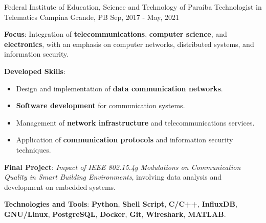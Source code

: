 
\begin{cventries}
  \cventry
  {Federal Institute of Education, Science and Technology of Paraíba} %
  {Technologist in Telematics} %
  {Campina Grande, PB} %
  {Sep, 2017 - May, 2021} %
  {
    \begin{cvitems}
      \item {\textbf{Focus}: Integration of \textbf{telecommunications}, \textbf{computer science}, and \textbf{electronics}, with an emphasis on computer networks, distributed systems, and information security.}
      \item {\textbf{Developed Skills}:}
      \begin{itemize}
        \item {Design and implementation of \textbf{data communication networks}.}
        \item {\textbf{Software development} for communication systems.}
        \item {Management of \textbf{network infrastructure} and telecommunications services.}
        \item {Application of \textbf{communication protocols} and information security techniques.}
      \end{itemize}
      \item {\textbf{Final Project}: \emph{Impact of IEEE 802.15.4g Modulations on Communication Quality in Smart Building Environments}, involving data analysis and development on embedded systems.}
      \item {\textbf{Technologies and Tools}: \textbf{Python}, \textbf{Shell Script}, \textbf{C/C++}, \textbf{InfluxDB}, \textbf{GNU/Linux}, \textbf{PostgreSQL}, \textbf{Docker}, \textbf{Git}, \textbf{Wireshark}, \textbf{MATLAB}.}
    \end{cvitems}
  }
\end{cventries}
